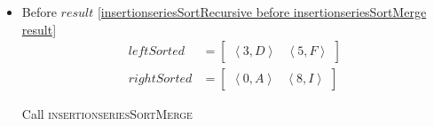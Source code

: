 \begin{frame}[containsverbatim]{\insertionseriesexampleframe}
\begin{columns}[c]
\begin{column}{0.6\textwidth}
\begin{itemize}
                            \item Before $result$ \cref{insertionseriesSortRecursive before insertionseriesSortMerge result}
                            \begin{align*}
                                leftSorted & = \begin{bmatrix}\left<3, D\right> & \left<5, F\right>\end{bmatrix} \\
                                rightSorted & = \begin{bmatrix}\left<0, A\right> & \left<8, I\right>\end{bmatrix}
                            \end{align*}

                            Call \textsc{insertionseriesSortMerge}
                        \end{itemize}
                \end{column}
            \end{columns}
        \end{frame}

